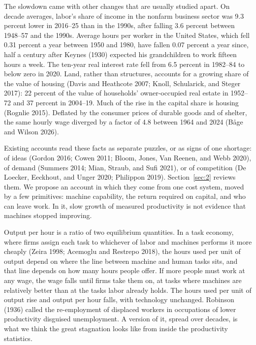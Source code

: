 \documentclass[12pt]{article}
\theoremstyle{plain}
\begin{document}
The slowdown came with other changes that are usually studied apart. On decade averages, labor's share of income in the nonfarm business sector was 9.3 percent lower in 2016--25 than in the 1990s, after falling 3.6 percent between 1948--57 and the 1990s. Average hours per worker in the United States, which fell 0.31 percent a year between 1950 and 1980, have fallen 0.07 percent a year since, half a century after Keynes (1930) expected his grandchildren to work fifteen hours a week. The ten-year real interest rate fell from 6.5 percent in 1982--84 to below zero in 2020. Land, rather than structures, accounts for a growing share of the value of housing (Davis and Heathcote 2007; Knoll, Schularick, and Steger 2017): 22 percent of the value of households' owner-occupied real estate in 1952--72 and 37 percent in 2004--19. Much of the rise in the capital share is housing (Rognlie 2015). Deflated by the consumer prices of durable goods and of shelter, the same hourly wage diverged by a factor of 4.8 between 1964 and 2024 (B\r{a}ge and Wilson 2026).

Existing accounts read these facts as separate puzzles, or as signs of one shortage: of ideas (Gordon 2016; Cowen 2011; Bloom, Jones, Van Reenen, and Webb 2020), of demand (Summers 2014; Mian, Straub, and Sufi 2021), or of competition (De Loecker, Eeckhout, and Unger 2020; Philippon 2019). Section~\ref{sec:2} reviews them. We propose an account in which they come from one cost system, moved by a few primitives: machine capability, the return required on capital, and who can leave work. In it, slow growth of measured productivity is not evidence that machines stopped improving.

Output per hour is a ratio of two equilibrium quantities. In a task economy, where firms assign each task to whichever of labor and machines performs it more cheaply (Zeira 1998; Acemoglu and Restrepo 2018), the hours used per unit of output depend on where the line between machine and human tasks sits, and that line depends on how many hours people offer. If more people must work at any wage, the wage falls until firms take them on, at tasks where machines are relatively better than at the tasks labor already holds. The hours used per unit of output rise and output per hour falls, with technology unchanged. Robinson (1936) called the re-employment of displaced workers in occupations of lower productivity disguised unemployment. A version of it, spread over decades, is what we think the great stagnation looks like from inside the productivity statistics.
\end{document}
